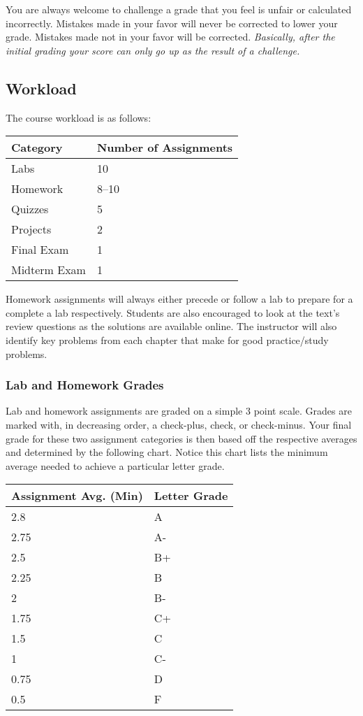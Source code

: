 \documentclass[10pt]{article}
\begin{document}
You are always welcome to challenge a grade that you feel is unfair or calculated incorrectly.  Mistakes made in your favor will never be corrected to lower your grade.  Mistakes made not in your favor will be corrected.  \textit{Basically, after the initial grading your score can only go up as the result of a challenge.}

\subsection{Workload}

The course workload is as follows:
\begin{center}
  \begin{tabular}{ll}
    Category & Number of Assignments \\ \toprule
    Labs & 10 \\
    Homework & 8--10 \\
    Quizzes & 5 \\
    Projects & 2 \\
    Final Exam & 1 \\
    Midterm Exam & 1
  \end{tabular}
\end{center}

Homework assignments will always either precede or follow a lab to prepare for a complete a lab respectively. Students are also encouraged to look at the text's review questions as the solutions are available online.  The instructor will also identify key problems from each chapter that make for good practice/study problems.

\subsubsection{Lab and Homework Grades}

Lab and homework assignments are graded on a simple 3 point scale. Grades are marked with, in decreasing order, a check-plus, check, or check-minus. Your final grade for these two assignment categories is then based off the respective averages and determined by the following chart.  Notice this chart lists the minimum average needed to achieve a particular letter grade.

\begin{center}
\begin{small}
\begin{tabular}{ll}
Assignment Avg. (Min) & Letter Grade \\ \toprule
2.8   & A  \\
2.75    & A- \\
2.5 & B+ \\
2.25    & B  \\
2   & B- \\
1.75    & C+ \\
1.5 & C  \\
1   & C- \\
0.75    & D  \\
0.5  & F
\end{tabular}
\end{small}
\end{center}
\end{document}
